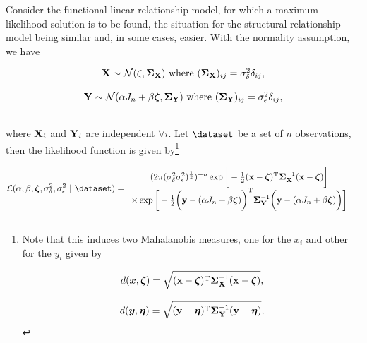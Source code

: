 \documentclass{homework}
\begin{document}
Consider the functional linear relationship model, for which a maximum likelihood solution is to be found, the situation for the structural relationship model being similar and, in some cases, easier. With the normality assumption, we have 

$$
\begin{array}{c}
    {\bf X} \sim \mathcal{N}(\zeta, \bm{\Sigma}_{{\bf X}}) \textnormal{ where } (\bm{\Sigma}_{{\bf X}})_{ij} = \sigma_{\delta}^2 \delta_{ij}, \\
    \\
    {\bf Y} \sim \mathcal{N}(\alpha J_n + \beta \bm{\zeta}, \bm{\Sigma}_{{\bf Y}}) \textnormal{ where } (\bm{\Sigma}_{{\bf Y}})_{ij} = \sigma_{\epsilon}^2 \delta_{ij},\\
    \\
\end{array}
$$

where ${\bf X}_i$ and ${\bf Y}_i$ are independent $\forall i$. Let $\dataset$ be a set of $n$ observations, then the likelihood function is given by\footnote{Note that this induces two Mahalanobis measures, one for the $x_i$ and other for the $y_i$ given by 

\begin{equation*}
    \begin{array}{c}
         d(\bm{x}, \bm{\zeta}) = \sqrt{({\bf x} - {\bm \zeta})^{\textnormal{T}} \bm{\Sigma}_{{\bf X}}^{-1} ({\bf x} - {\bm \zeta})},  \\
         \\
         d(\bm{y}, \bm{\eta}) = \sqrt{({\bf y} - {\bm \eta})^{\textnormal{T}} \bm{\Sigma}_{{\bf Y}}^{-1} ({\bf y} - {\bm \eta})},
    \end{array}
\end{equation*}}

\begin{align}
    \mathcal{L}(\alpha, \beta, \bm{\zeta}, \sigma_{\delta}^2 ,\sigma_{\epsilon}^2 \blank &| \blank \dataset) = \begin{array}{c}
         {(2\pi (\sigma_{\delta}^2  \sigma_{\epsilon}^2)^{\frac{1}{2}})^{-n}} \exp\bigg[-\frac{1}{2}{({\bf x} - {\bm \zeta})^{\textnormal{T}} \bm{\Sigma}_{\X}^{-1} ({\bf x} - {\bm \zeta})}\bigg] \\
         \times \exp\bigg[-\frac{1}{2}{\bigg({\bf y} - (\alpha J_n + \beta
    \bm{\zeta})\bigg)^{\textnormal{T}} \bm{\Sigma}_{\Y}^{-1}\bigg({\bf y} - (\alpha J_n + \beta \bm{\zeta})\bigg)}\bigg] 
    \end{array}  
    \label{EIV likelihood}
\end{align}
\end{document}
